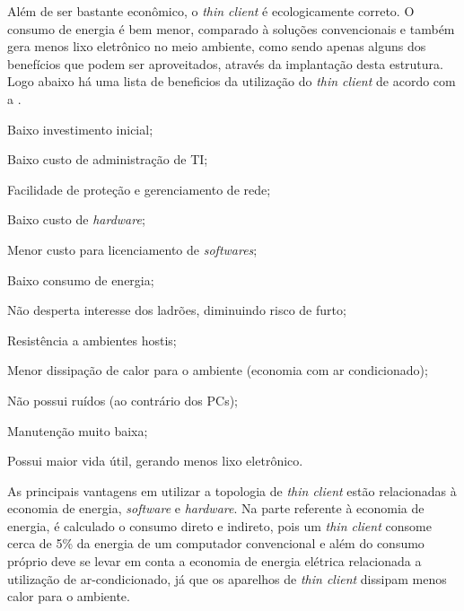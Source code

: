 \documentclass[
	12pt,				%
	openright,			%
	twoside,			%
	a4paper,			%
	chapter=TITLE,		%
	english,			%
	brazil				%
	]{abntex2}
\begin{document}
Além de ser bastante econômico, o \textit{thin client} é ecologicamente correto. O consumo de energia é bem menor, comparado à soluções convencionais e também gera menos lixo eletrônico no meio ambiente, como sendo apenas alguns dos benefícios que podem ser aproveitados, através da implantação desta estrutura. Logo abaixo há uma lista de beneficios da utilização do \textit{thin client} de acordo com a .

\begin{alineas}
\item Baixo investimento inicial;
\item Baixo custo de administração de TI;
\item Facilidade de proteção e gerenciamento de rede;
\item Baixo custo de \textit{hardware};
\item Menor custo para licenciamento de \textit{softwares};
\item Baixo consumo de energia;
\item Não desperta interesse dos ladrões, diminuindo risco de furto;
\item Resistência a ambientes hostis;
\item Menor dissipação de calor para o ambiente (economia com ar condicionado);
\item Não possui ruídos (ao contrário dos PCs);
\item Manutenção muito baixa;
\item Possui maior vida útil, gerando menos lixo eletrônico.
\end{alineas}

As principais vantagens em utilizar a topologia de \textit{thin client} estão relacionadas à economia de energia, \textit{software} e \textit{hardware}. Na parte referente à economia de energia, é calculado o consumo direto e indireto, pois um \textit{thin client} consome cerca de 5\% da energia de um computador convencional e além do consumo próprio deve se levar em conta a economia de energia elétrica relacionada a utilização de ar-condicionado, já que os aparelhos de \textit{thin client} dissipam menos calor para o ambiente.\cite{EmailThinClient}
	 

\begin{table}[h!]
\end{table}
\end{document}
